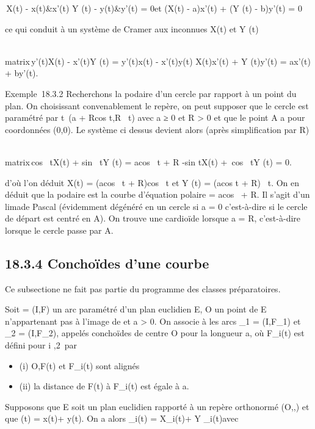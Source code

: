 \documentclass[]{article}
\begin{document}
\left
\matrix\,X(t) - x(t)&x'(t)
\cr Y (t) - y(t)&y'(t)\right 
= 0\text et (X(t) - a)x'(t) + (Y (t) - b)y'(t) = 0

ce qui conduit à un système de Cramer aux inconnues X(t) et Y (t)

\left
\\matrix\,y'(t)X(t) -
x'(t)Y (t) = y'(t)x(t) - x'(t)y(t) \cr X(t)x'(t) + Y
(t)y'(t) = ax'(t) + by'(t)\right .

Exemple~18.3.2 Recherchons la podaire d'un cercle par rapport à un point
du plan. On choisissant convenablement le repère, on peut supposer que
le cercle est paramétré par t\mapsto~(a +
Rcos t,R\sin~ t) avec
a ≥ 0 et R > 0 et que le point A a pour coordonnées (0,0).
Le système ci dessus devient alors (après simplification par R)

\left
\\matrix\,cos~
tX(t) + sin~ tY (t) =
acos~ t + R \cr
-sin tX(t) +\ cos~ tY
(t) = 0\right .

d'où l'on déduit X(t) = (acos~ t +
R)cos~ t et Y (t) =
(acos t + R)\sin~ t.
On en déduit que la podaire est la courbe d'équation polaire \rho =
acos~ \theta + R. Il s'agit d'un
lima\ccon de Pascal (évidemment dégénéré en un cercle
si a = 0 c'est-à-dire si le cercle de départ est centré en A). On trouve
une cardioïde lorsque a = R, c'est-à-dire lorsque le cercle passe par A.

\subsection{18.3.4 Conchoïdes d'une courbe}

Ce subsectione ne fait pas partie du programme des classes préparatoires.

Soit \Gamma = (I,F) un arc paramétré d'un plan euclidien E, O un point de E
n'appartenant pas à l'image de \Gamma et a > 0. On associe à \Gamma
les arcs \Gamma_1 = (I,F_1) et \Gamma_2 =
(I,F_2), appelés conchoïdes de centre O pour la longueur a, où
F_i(t) est défini pour i
\in\1,2\ par

\begin{itemize}
\itemsep1pt\parskip0pt
\item
  (i) O,F(t) et F_i(t) sont alignés
\item
  (ii) la distance de F(t) à F_i(t) est égale à a.
\end{itemize}

Supposons que E soit un plan euclidien rapporté à un repère orthonormé
(O,\vec\imath,) et que
\overrightarrowOF(t) = x(t)\vec\imath +
y(t). On a alors
\overrightarrowOF_i(t) =
X_i(t)\vec\imath + Y
_i(t) avec
\end{document}
